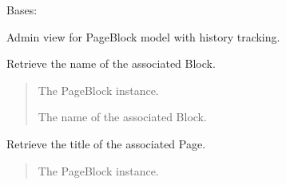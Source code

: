 \documentclass[letterpaper,10pt,english]{sphinxmanual}
\begin{document}
\begin{fulllineitems}
\label{\detokenize{pages_app:pages_app.admin.PageBlockAdmin}}
\pysigstartsignatures
\pysiglinewithargsret
{}
{\sphinxparamcomma {}}
{}
\pysigstopsignatures
\sphinxAtStartPar
Bases: 

\sphinxAtStartPar
Admin view for PageBlock model with history tracking.

\begin{fulllineitems}
\label{\detokenize{pages_app:pages_app.admin.PageBlockAdmin.get_block_name}}
\pysigstartsignatures
\pysiglinewithargsret
{}
{}
{}
\pysigstopsignatures
\sphinxAtStartPar
Retrieve the name of the associated Block.
\begin{quote}\begin{description}
\sphinxAtStartPar
{} \textendash{} The PageBlock instance.

\sphinxAtStartPar
The name of the associated Block.

\end{description}\end{quote}

\end{fulllineitems}


\begin{fulllineitems}
\label{\detokenize{pages_app:pages_app.admin.PageBlockAdmin.get_page_title}}
\pysigstartsignatures
\pysiglinewithargsret
{}
{}
{}
\pysigstopsignatures
\sphinxAtStartPar
Retrieve the title of the associated Page.
\begin{quote}\begin{description}
\sphinxAtStartPar
{} \textendash{} The PageBlock instance.


\end{description}
\end{quote}
\end{fulllineitems}
\end{fulllineitems}
\end{document}
